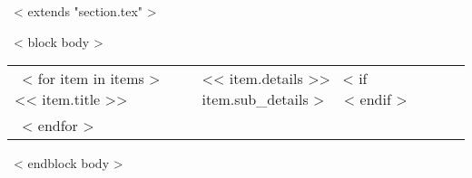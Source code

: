 ~< extends "section.tex" >~

~< block body >~
\begin{tabular}{p{1in}p{5in}}
  ~< for item in items >~
    << item.title >> & << item.details >>
    ~< if item.sub_details >~
    \scriptsize{
      \color{gray}{<< item.sub_details >>}
    }
    ~< endif >~ \\
  ~< endfor >~
\end{tabular}
~< endblock body >~
